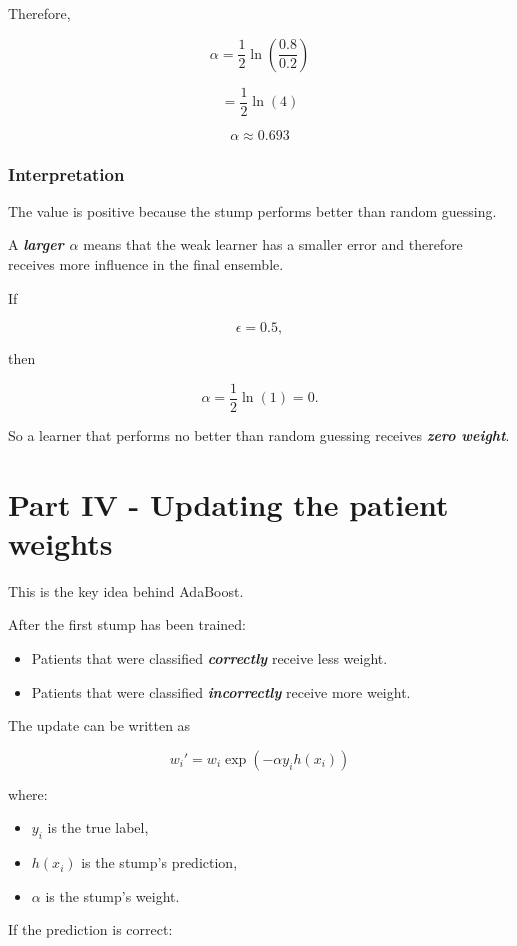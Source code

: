 \documentclass[10pt]{article}
\begin{document}
Therefore,

\[
\alpha=
\frac12
\ln\left(\frac{0.8}{0.2}\right)
\]

\[
=
\frac12\ln(4)
\]

\[
{\alpha\approx0.693}
\]

\subsubsection*{Interpretation}
The value is positive because the stump performs better than random guessing.

A \textbf{\textit{larger $\alpha$}} means that the weak learner has a smaller error and therefore receives more influence in the final ensemble.

If

\[
\epsilon=0.5,
\]

then

\[
\alpha=
\frac12\ln(1)=0.
\]

So a learner that performs no better than random guessing receives \textbf{\textit{zero weight}}.

\par\endgroup

\clearpage
\section*{Part IV - Updating the patient weights}
This is the key idea behind AdaBoost.

After the first stump has been trained:

\begin{itemize}
\item
Patients that were classified \textbf{\textit{correctly}} receive less weight.

\item
Patients that were classified \textbf{\textit{incorrectly}} receive more weight.

\end{itemize}
The update can be written as

\[
w_i'
=
w_i
\exp(-\alpha y_i h(x_i))
\]

where:

\begin{itemize}
\item
$y_i$ is the true label,

\item
$h(x_i)$ is the stump's prediction,

\item
$\alpha$ is the stump's weight.

\end{itemize}
If the prediction is correct:
\end{document}
